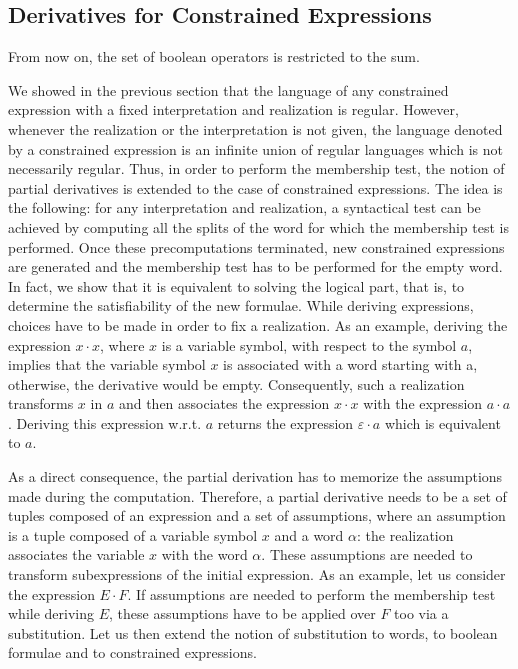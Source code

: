 \documentclass[a4paper]{llncs}
\begin{document}
  \subsection{Derivatives for Constrained Expressions}   
   
    \begin{remark}
From now on, the set of boolean operators is restricted to the sum.
  \end{remark}
  
 




We showed in the previous section that the language of any constrained expression with a fixed interpretation and realization is regular. However, whenever the realization or the interpretation is not given, the language denoted by a constrained expression is an infinite union of regular languages which is not necessarily regular. Thus, in order to perform the membership test, the notion of partial derivatives is extended to the case of constrained expressions.
The idea is the following: for any interpretation and realization, a syntactical test can be achieved by computing all the splits of the word for which the membership test is performed. Once these precomputations terminated, new constrained expressions are generated and the membership test has to be performed for the empty word. In fact, we show that it is equivalent to solving the logical part, that is, to determine the satisfiability of the new formulae.
   While deriving expressions, choices have to be made in order to fix a realization. As an example, deriving the expression $x\cdot x$, where $x$ is a variable symbol, with respect to the symbol $a$, implies that the variable symbol $x$ is associated with a word starting with a, otherwise, the derivative would be empty. Consequently, such a realization transforms $x$ in $a$ and then associates the expression $x\cdot x$ with the expression $a\cdot a$. Deriving this expression w.r.t. $a$ returns the expression $\varepsilon\cdot a$ which is equivalent to $a$.
  


  As a direct consequence, the partial derivation has to memorize the assumptions made during the computation. Therefore, a partial derivative needs to be a set of tuples composed of an expression and a set of assumptions, where an assumption is a tuple composed of a variable symbol $x$ and a word $\alpha$: the realization associates the variable $x$ with the word $\alpha$.    
These assumptions are needed to transform subexpressions of the initial expression. As an example, let us consider the expression $E\cdot F$. If assumptions are needed to perform the membership test while deriving $E$, these assumptions have to be applied over $F$ too via a substitution. Let us then extend the notion of substitution to words, to boolean formulae and to constrained expressions.
\end{document}
